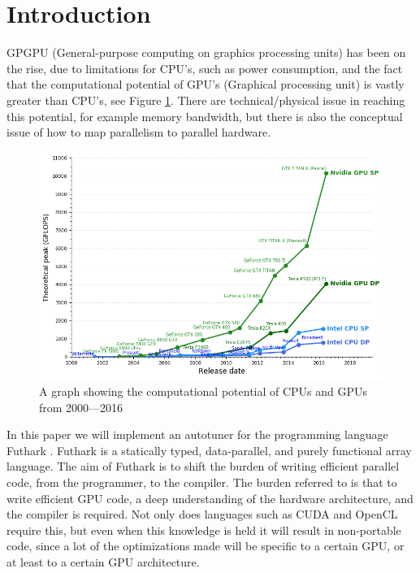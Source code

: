 \section{Introduction}
GPGPU (General-purpose computing on graphics processing units) has been on the
rise, due to limitations for CPU's, such as power consumption, and the fact
that the computational potential of GPU's (Graphical processing unit) is vastly
greater than CPU's, see Figure \ref{potential}. There are technical/physical
issue in reaching this potential, for example memory bandwidth, but there is
also the conceptual issue of how to map parallelism to parallel hardware.
\begin{figure}[h]
	\centering
	\includegraphics[width=.8\textwidth]{resources/graf.png}
	\caption{A graph showing the computational potential of CPUs and GPUs from 2000---2016 \cite{cpu-vs-gpu}}
	\label{potential}
\end{figure}

In this paper we will implement an autotuner for the programming language
Futhark \cite{futhark-home}. Futhark is a statically typed, data-parallel, and
purely functional array language. The aim of Futhark is to shift the burden of
writing efficient parallel code, from the programmer, to the compiler. The
burden referred to is that to write efficient GPU code, a deep understanding of
the hardware architecture, and the compiler is required. Not only does
languages such as CUDA and OpenCL require this, but even when this knowledge is
held it will result in non-portable code, since a lot of the optimizations made
will be specific to a certain GPU, or at least to a certain GPU architecture. 

